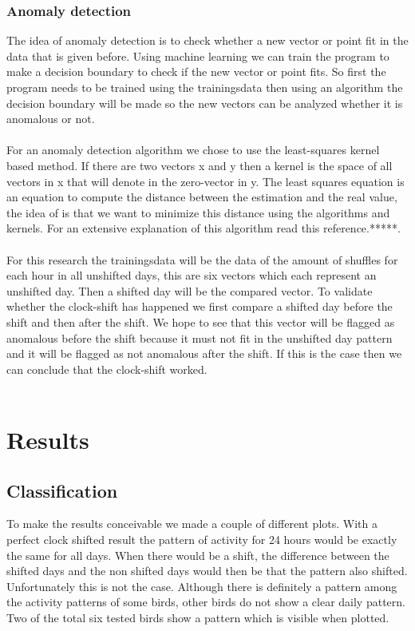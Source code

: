 \documentclass[a4paper]{article}
\begin{document}
\subsubsection*{Anomaly detection}
The idea of anomaly detection is to check whether a new vector or point fit in the data that is given before. Using machine learning we can train the program to make a decision boundary to check if the new vector or point fits. So first the program needs to be trained using the trainingsdata then using an algorithm the decision boundary will be made so the new vectors can be analyzed whether it is anomalous or not.\\\\
For an anomaly detection algorithm we chose to use the least-squares kernel based method.  If there are two vectors x and y then a kernel is the space of all vectors in x that will denote in the zero-vector in y. The least squares equation is an equation to compute the distance between the estimation and the real value, the idea of is that we want to minimize this distance using the algorithms and kernels. For an extensive explanation of this algorithm read this reference.*****.\\\\
For this research the trainingsdata will be the data of the amount of shuffles for each hour in all unshifted days, this are six vectors which each represent an unshifted day. Then a shifted day will be the compared vector. To validate whether the clock-shift has happened we first compare a shifted day before the shift and then after the shift. We hope to see that this vector will be flagged as anomalous before the shift because it must not fit in the unshifted day pattern and it will be flagged as not anomalous after the shift. If this is the case then we can conclude that the clock-shift worked.\\\
\section*{Results}

\subsection*{Classification}
To make the results conceivable we made a couple of different plots. With a perfect clock shifted result the pattern of activity for 24 hours would be exactly the same for all days. When there would be a shift, the difference between the shifted days and the non shifted days would then be that the pattern also shifted. \\
Unfortunately this is not the case. Although there is definitely a pattern among the activity patterns of some birds, other birds do not show a clear daily pattern. Two of the total six tested birds show a pattern which is visible when plotted.
\end{document}
